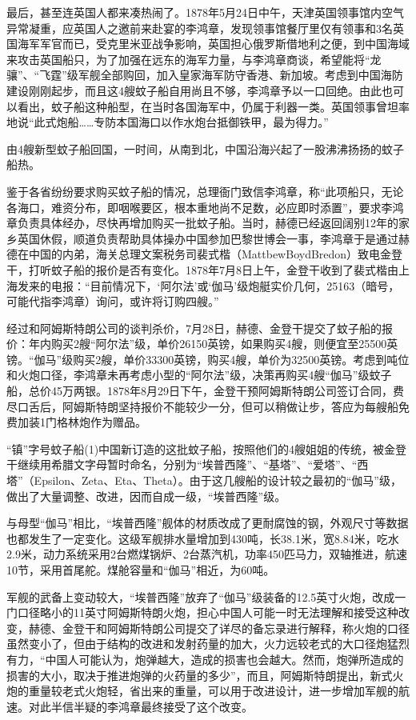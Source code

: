 \documentclass[12pt,UTF8]{ctexbook}
\begin{document}
最后，甚至连英国人都来凑热闹了。1878年5月24日中午，天津英国领事馆内空气异常凝重，应英国人之邀前来赴宴的李鸿章，发现领事馆餐厅里仅有领事和3名英国海军军官而已，受克里米亚战争影响，英国担心俄罗斯借地利之便，到中国海域来攻击英国船只，为了加强在远东的海军力量，与李鸿章商谈，希望能将“龙骧”、“飞霆”级军舰全部购回，加入皇家海军防守香港、新加坡。考虑到中国海防建设刚刚起步，而且这4艘蚊子船自用尚且不够，李鸿章予以一口回绝。由此也可以看出，蚊子船这种船型，在当时各国海军中，仍属于利器一类。英国领事曾坦率地说“此式炮船……专防本国海口以作水炮台抵御铁甲，最为得力。”

由4艘新型蚊子船回国，一时间，从南到北，中国沿海兴起了一股沸沸扬扬的蚊子船热。

鉴于各省纷纷要求购买蚊子船的情况，总理衙门致信李鸿章，称“此项船只，无论各海口，难资分布，即咽喉要区，根本重地尚不足数，必应即时添置”，要求李鸿章负责具体经办，尽快再增加购买一批蚊子船。当时，赫德已经返回阔别12年的家乡英国休假，顺道负责帮助具体操办中国参加巴黎世博会一事，李鸿章于是通过赫德在中国的内弟，海关总理文案税务司裴式楷（MattbewBoydBredon）致电金登干，打听蚊子船的报价是否有变化。1878年7月8日上午，金登干收到了裴式楷由上海发来的电报：“目前情况下，‘阿尔法’或‘伽马’级炮艇实价几何，25163（暗号，可能代指李鸿章）询问，或许将订购四艘。”

经过和阿姆斯特朗公司的谈判杀价，7月28日，赫德、金登干提交了蚊子船的报价：年内购买2艘“阿尔法”级，单价26150英镑，如果购买4艘，则便宜至25500英镑。“伽马”级购买2艘，单价33300英镑，购买4艘，单价为32500英镑。考虑到吨位和火炮口径，李鸿章未再考虑小型的“阿尔法”级，决策再购买4艘“伽马”级蚊子船，总价45万两银。1878年8月29日下午，金登干预阿姆斯特朗公司签订合同，费尽口舌后，阿姆斯特朗坚持报价不能较少一分，但可以稍做让步，答应为每艘船免费加装1门格林炮作为赠品。

“镇”字号蚊子船(1)中国新订造的这批蚊子船，按照他们的4艘姐姐的传统，被金登干继续用希腊文字母暂时命名，分别为“埃普西隆”、“基塔”、“爱塔”、“西塔”（Epsilon、Zeta、Eta、Theta）。由于这几艘船的设计较之最初的“伽马”级，做出了大量调整、改进，因而自成一级，“埃普西隆”级。

与母型“伽马”相比，“埃普西隆”舰体的材质改成了更耐腐蚀的钢，外观尺寸等数据也都发生了一定变化。这级军舰排水量增加到430吨，长38.1米，宽8.84米，吃水2.9米，动力系统采用2台燃煤锅炉、2台蒸汽机，功率450匹马力，双轴推进，航速10节，采用首尾舵。煤舱容量和“伽马”相近，为60吨。

军舰的武备上变动较大，“埃普西隆”放弃了“伽马”级装备的12.5英寸火炮，改成一门口径略小的11英寸阿姆斯特朗火炮，担心中国人可能一时无法理解和接受这种改变，赫德、金登干和阿姆斯特朗公司提交了详尽的备忘录进行解释，称火炮的口径虽然变小了，但由于结构的改进和发射药量的加大，火力远较老式的大口径炮猛烈有力，“中国人可能认为，炮弹越大，造成的损害也会越大。然而，炮弹所造成的损害的大小，取决于推进炮弹的火药量的多少”，而且，阿姆斯特朗提出，新式火炮的重量较老式火炮轻，省出来的重量，可以用于改进设计，进一步增加军舰的航速。对此半信半疑的李鸿章最终接受了这个改变。
\end{document}
